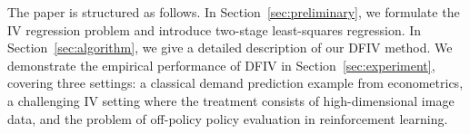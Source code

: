 The paper is structured as follows. In Section~\ref{sec:preliminary}, we formulate the IV regression problem and introduce two-stage least-squares regression. In Section~\ref{sec:algorithm}, we give a detailed description of our DFIV method. We demonstrate the empirical performance of DFIV in Section~\ref{sec:experiment}, covering three settings: a classical demand prediction example from econometrics, a challenging IV setting where the treatment consists of high-dimensional image data, and the problem of off-policy policy evaluation in reinforcement learning. 
